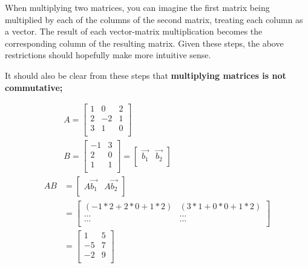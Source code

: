 \documentclass[12pt]{article}
\begin{document}
\begin{itemize}
    When multiplying two matrices, you can imagine the first matrix being multiplied by each of the columns of the second matrix, treating each column as a vector. The result of each vector-matrix multiplication becomes the corresponding column of the resulting matrix. Given these steps, the above restrictions should hopefully make more intuitive sense.
    
    It should also be clear from these steps that \textbf{multiplying matrices is not commutative;}
    
    \begin{equation}
        \begin{split}
            &A = \begin{bmatrix}
            1 & 0 & 2 \\
            2 & -2 & 1 \\
            3 & 1 & 0 \\
            \end{bmatrix}\\
            &B = \begin{bmatrix}
            -1 & 3\\
            2 & 0\\
            1 & 1\\
            \end{bmatrix} = \begin{bmatrix}
            \Vec{b_1} & \vec{b_2}\\
            \end{bmatrix}\\
            AB &= \begin{bmatrix}
            A\Vec{b_1} & A\Vec{b_2}\\
            \end{bmatrix}\\
            &= \begin{bmatrix}
                (-1*2+2*0+1*2) & (3*1 + 0*0 + 1*2) \\
                ... & ...\\
                ... & ...\\
            \end{bmatrix}\\
            &= \begin{bmatrix}
                1 & 5\\
                -5 & 7\\
                -2 & 9\\
            \end{bmatrix}
        \end{split}
    \end{equation}
    

\end{itemize}
\end{document}
